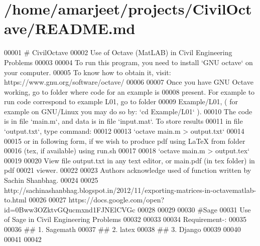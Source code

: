 \hypertarget{README_8md_source}{}\section{/home/amarjeet/projects/\+Civil\+Octave/\+R\+E\+A\+D\+M\+E.md}

\begin{DoxyCode}
00001 # CivilOctave
00002 Use of Octave (MatLAB) in Civil Engineering Problems
00003 
00004 To run this program, you need to install `GNU octave` on your computer.
00005 To know how to obtain it, visit: https://www.gnu.org/software/octave/
00006 
00007 Once you have GNU Octave working, go to folder where code for an example is
00008 present. For example to run code correspond to example L01, go to folder
00009 Example/L01, ( for example on GNU/Linux you may do so by: `cd Example/L01` ).
00010 The code is in file `main.m`, and data is in file `input.mat`. To store results
00011 in file `output.txt`, type command:
00012 
00013 `octave main.m > output.txt`
00014 
00015 or in following form, if we wish to produce pdf using LaTeX from folder
00016 (tex, if available) using run.sh
00017 
00018 `octave main.m > output.tex`
00019 
00020 View file output.txt in any text editor, or main.pdf (in tex folder) in pdf
00021 viewer.
00022 
00023 Authors acknowledge used of function written by Sachin Shanbhag.
00024 
00025 http://sachinashanbhag.blogspot.in/2012/11/exporting-matrices-in-octavematlab-to.html
00026 
00027 https://docs.google.com/open?id=0Bww3OZktvGQucmxnd1FJNElCVGc
00028 
00029 
00030 #Sage
00031 Use of Sage in Civil Engineering Problems 
00032 
00033 
00034 Requirement-:
00035 
00036 ## 1. Sagemath
00037 ## 2. latex 
00038 ## 3. Django
00039 
00040 
00041 
00042 
\end{DoxyCode}
